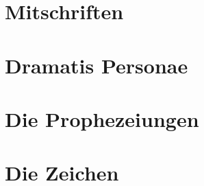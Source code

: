 \documentclass[11pt]{scrreprt}
\begin{document}
\chapter{Mitschriften}




\chapter{Dramatis Personae}



\chapter{Die Prophezeiungen}



\chapter{Die Zeichen}


\end{document}
